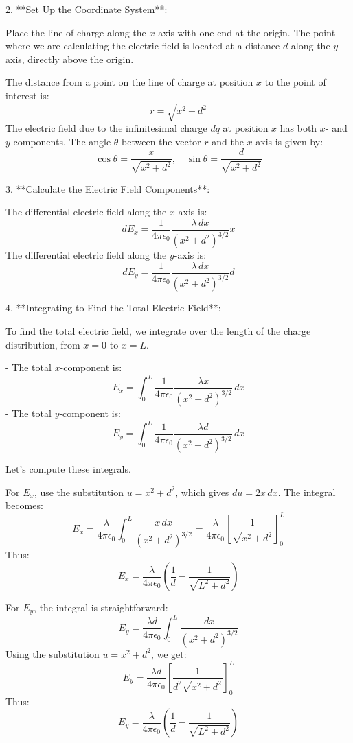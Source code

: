 2. **Set Up the Coordinate System**:

Place the line of charge along the \( x \)-axis with one end at the origin. The point where we are calculating the electric field is located at a distance \( d \) along the \( y \)-axis, directly above the origin.

The distance from a point on the line of charge at position \( x \) to the point of interest is:
\[
r = \sqrt{x^2 + d^2}
\]
The electric field due to the infinitesimal charge \( dq \) at position \( x \) has both \( x \)- and \( y \)-components. The angle \( \theta \) between the vector \( r \) and the \( x \)-axis is given by:
\[
\cos \theta = \frac{x}{\sqrt{x^2 + d^2}}, \quad \sin \theta = \frac{d}{\sqrt{x^2 + d^2}}
\]

3. **Calculate the Electric Field Components**:

The differential electric field along the \( x \)-axis is:
\[
dE_x = \frac{1}{4 \pi \epsilon_0} \frac{\lambda \, dx}{(x^2 + d^2)^{3/2}} x
\]
The differential electric field along the \( y \)-axis is:
\[
dE_y = \frac{1}{4 \pi \epsilon_0} \frac{\lambda \, dx}{(x^2 + d^2)^{3/2}} d
\]

4. **Integrating to Find the Total Electric Field**:

To find the total electric field, we integrate over the length of the charge distribution, from \( x = 0 \) to \( x = L \).

- The total \( x \)-component is:
\[
E_x = \int_0^L \frac{1}{4 \pi \epsilon_0} \frac{\lambda x}{(x^2 + d^2)^{3/2}} \, dx
\]
- The total \( y \)-component is:
\[
E_y = \int_0^L \frac{1}{4 \pi \epsilon_0} \frac{\lambda d}{(x^2 + d^2)^{3/2}} \, dx
\]

Let's compute these integrals.

For \( E_x \), use the substitution \( u = x^2 + d^2 \), which gives \( du = 2x \, dx \). The integral becomes:
\[
E_x = \frac{\lambda}{4 \pi \epsilon_0} \int_0^L \frac{x \, dx}{(x^2 + d^2)^{3/2}} = \frac{\lambda}{4 \pi \epsilon_0} \left[ \frac{1}{\sqrt{x^2 + d^2}} \right]_0^L
\]
Thus:
\[
E_x = \frac{\lambda}{4 \pi \epsilon_0} \left( \frac{1}{d} - \frac{1}{\sqrt{L^2 + d^2}} \right)
\]

For \( E_y \), the integral is straightforward:
\[
E_y = \frac{\lambda d}{4 \pi \epsilon_0} \int_0^L \frac{dx}{(x^2 + d^2)^{3/2}}
\]
Using the substitution \( u = x^2 + d^2 \), we get:
\[
E_y = \frac{\lambda d}{4 \pi \epsilon_0} \left[ \frac{1}{d^2 \sqrt{x^2 + d^2}} \right]_0^L
\]
Thus:
\[
E_y = \frac{\lambda}{4 \pi \epsilon_0} \left( \frac{1}{d} - \frac{1}{\sqrt{L^2 + d^2}} \right)
\]

